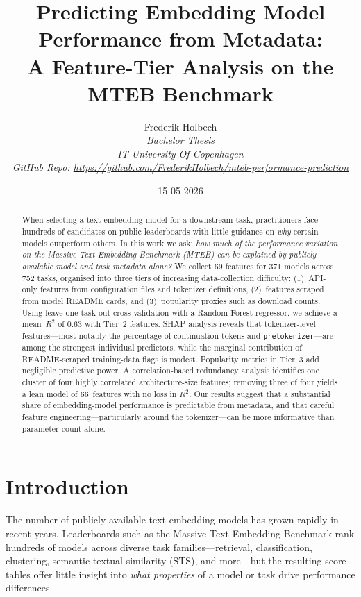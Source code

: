 \documentclass[11pt,a4paper,twocolumn]{article}
\title{Predicting Embedding Model Performance from Metadata:\\A Feature-Tier Analysis on the MTEB Benchmark}
\author{Frederik Holbech\\[4pt]
  \textit{Bachelor Thesis}\\
  \textit{IT-University Of Copenhagen}\\
  \textit{GitHub Repo: \hyperlink{mteb-performance-prediction}{https://github.com/FrederikHolbech/mteb-performance-prediction}}}
\date{15-05-2026}
\begin{document}
\maketitle
\thispagestyle{empty}
\newpage

\begin{abstract}
When selecting a text embedding model for a downstream task, practitioners face hundreds of candidates on public leaderboards with little guidance on \emph{why} certain models outperform others.
In this work we ask: \emph{how much of the performance variation on the Massive Text Embedding Benchmark (MTEB) can be explained by publicly available model and task metadata alone?}
We collect 69 features for 371 models across 752 tasks, organised into three tiers of increasing data-collection difficulty: (1)~API-only features from configuration files and tokenizer definitions, (2)~features scraped from model README cards, and (3)~popularity proxies such as download counts.
Using leave-one-task-out cross-validation with a Random Forest regressor, we achieve a mean~$R^2$ of 0.63 with Tier~2 features.
SHAP analysis reveals that tokenizer-level features---most notably the percentage of continuation tokens and \texttt{pretokenizer}---are among the strongest individual predictors, while the marginal contribution of README-scraped training-data flags is modest.
Popularity metrics in Tier~3 add negligible predictive power.
A correlation-based redundancy analysis identifies one cluster of four highly correlated architecture-size features; removing three of four yields a lean model of 66~features with no loss in $R^2$.
Our results suggest that a substantial share of embedding-model performance is predictable from metadata, and that careful feature engineering---particularly around the tokenizer---can be more informative than parameter count alone.
\end{abstract}

\newpage

\section{Introduction}
\label{sec:intro}

The number of publicly available text embedding models has grown rapidly in recent years.
Leaderboards such as the Massive Text Embedding Benchmark \citep[MTEB;][]{muennighoff2023mteb} rank hundreds of models across diverse task families---retrieval, classification, clustering, semantic textual similarity (STS), and more---but the resulting score tables offer little insight into \emph{what properties} of a model or task drive performance differences.
\end{document}
